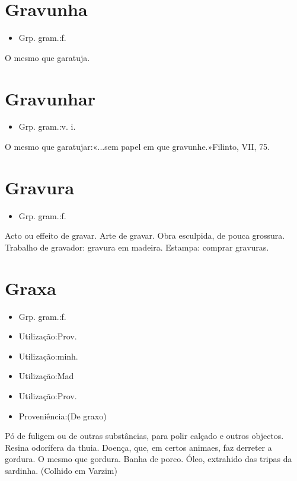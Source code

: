 \section{Gravunha}
\begin{itemize}
\item {Grp. gram.:f.}
\end{itemize}
O mesmo que \textunderscore garatuja\textunderscore .
\section{Gravunhar}
\begin{itemize}
\item {Grp. gram.:v. i.}
\end{itemize}
O mesmo que \textunderscore garatujar\textunderscore :«\textunderscore ...sem papel em que gravunhe.\textunderscore »Filinto, VII, 75.
\section{Gravura}
\begin{itemize}
\item {Grp. gram.:f.}
\end{itemize}
Acto ou effeito de gravar.
Arte de gravar.
Obra esculpida, de pouca grossura.
Trabalho de gravador: \textunderscore gravura em madeira\textunderscore .
Estampa: \textunderscore comprar gravuras\textunderscore .
\section{Graxa}
\begin{itemize}
\item {Grp. gram.:f.}
\end{itemize}
\begin{itemize}
\item {Utilização:Prov.}
\end{itemize}
\begin{itemize}
\item {Utilização:minh.}
\end{itemize}
\begin{itemize}
\item {Utilização:Mad}
\end{itemize}
\begin{itemize}
\item {Utilização:Prov.}
\end{itemize}
\begin{itemize}
\item {Proveniência:(De \textunderscore graxo\textunderscore )}
\end{itemize}
Pó de fuligem ou de outras substâncias, para polir calçado e outros objectos.
Resina odorífera da thuia.
Doença, que, em certos animaes, faz derreter a gordura.
O mesmo que \textunderscore gordura\textunderscore .
Banha de porco.
Óleo, extrahido das tripas da sardinha. (Colhido em Varzim)
